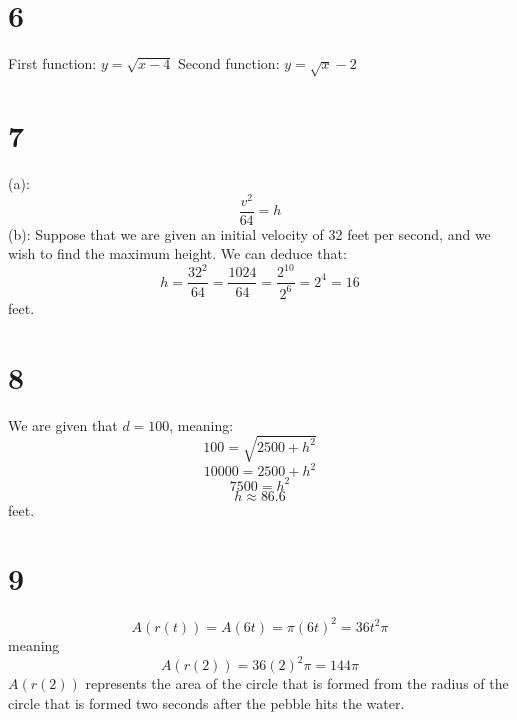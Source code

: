 \documentclass{article}
\theoremstyle{definition}
\newcommand{\?}{\stackrel{?}{=}}
\begin{document}
\section*{6}
First function: $y=\sqrt{x-4}$ \newline
Second function: $y=\sqrt{x}-2$

\section*{7}
(a): \[ \frac{v^2}{64}=h \]
(b): Suppose that we are given an initial velocity of 32 feet per second, and we wish to find the maximum height. We can deduce that:
\[ h=\frac{32^2}{64}=\frac{1024}{64}=\frac{2^{10}}{2^6}=2^4=16 \] feet.

\section*{8}
We are given that $d=100$, meaning:
\[ 100=\sqrt{2500+h^2} \]
\[ 10000=2500+h^2 \]
\[ 7500=h^2 \]
\[ h\approx 86.6 \] feet.

\section*{9}
\[ A(r(t))=A(6t)=\pi(6t)^2=36t^2\pi \]
meaning \[ A(r(2))=36(2)^2\pi=144\pi \] $A(r(2))$ represents the area of the circle that is formed from the radius of the circle that is 
formed two seconds after the pebble hits the water.
\end{document}

